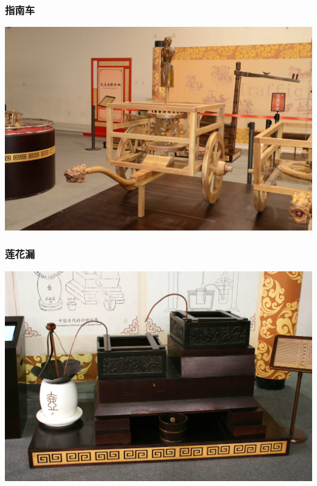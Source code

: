 \documentclass{beamer}
\begin{document}
\begin{frame}
\frametitle{指南车}
\label{sec-1-3}

\includegraphics[width=\textwidth]{image/zhinanche.jpg}
\end{frame}
\begin{frame}
\frametitle{莲花漏}
\label{sec-1-4}

\includegraphics[width=\textwidth]{image/lianhualou.jpg}
\end{frame}
\end{document}
